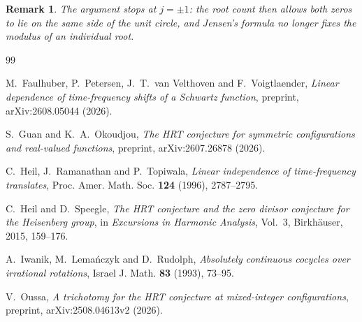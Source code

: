 \documentclass[10pt]{amsart}
\newtheorem{remark}[theorem]{Remark}
\begin{document}
\begin{remark}
The argument stops at $j=\pm1$: the root count then allows both zeros to lie on the same side
of the unit circle, and Jensen's formula no longer fixes the modulus of an individual root.
\end{remark}

\begin{thebibliography}{99}\small

M.~Faulhuber, P.~Petersen, J.~T.~van Velthoven and F.~Voigtlaender,
\emph{Linear dependence of time-frequency shifts of a Schwartz function},
preprint, arXiv:2608.05044 (2026).

S.~Guan and K.~A.~Okoudjou,
\emph{The HRT conjecture for symmetric configurations and real-valued functions},
preprint, arXiv:2607.26878 (2026).

C.~Heil, J.~Ramanathan and P.~Topiwala,
\emph{Linear independence of time-frequency translates},
Proc. Amer. Math. Soc. \textbf{124} (1996), 2787--2795.

C.~Heil and D.~Speegle,
\emph{The HRT conjecture and the zero divisor conjecture for the Heisenberg group},
in \emph{Excursions in Harmonic Analysis}, Vol.~3, Birkh\"auser, 2015, 159--176.

A.~Iwanik, M.~Lema\'nczyk and D.~Rudolph,
\emph{Absolutely continuous cocycles over irrational rotations},
Israel J. Math. \textbf{83} (1993), 73--95.

V.~Oussa,
\emph{A trichotomy for the HRT conjecture at mixed-integer configurations},
preprint, arXiv:2508.04613v2 (2026).

\end{thebibliography}
\end{document}
